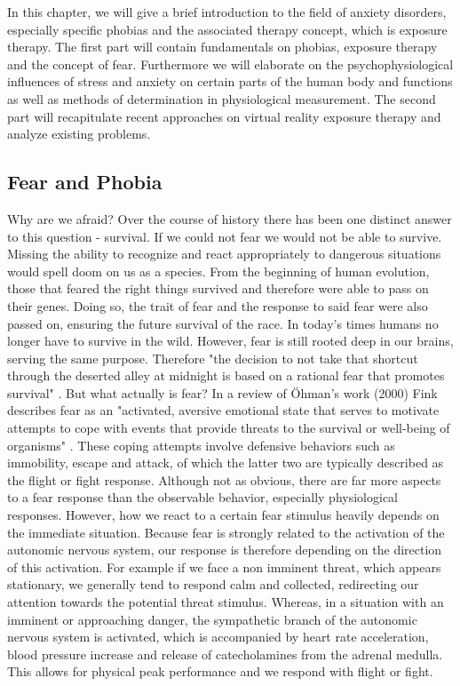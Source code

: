 In this chapter, we will give a brief introduction to the field of anxiety disorders, especially specific phobias and the associated therapy concept, which is exposure therapy. The first part will contain fundamentals on phobias, exposure therapy and the concept of fear. Furthermore we will elaborate on the psychophysiological influences of stress and anxiety on certain parts of the human body and functions as well as methods of determination in physiological measurement. The second part will recapitulate recent approaches on virtual reality exposure therapy and analyze existing problems. 

\subsection{Fear and Phobia} 
Why are we afraid? Over the course of history there has been one distinct answer to this question - survival. If we could not fear we would not be able to survive. Missing the ability to recognize and react appropriately to dangerous situations would spell doom on us as a species. From the beginning of human evolution, those that feared the right things survived and therefore were able to pass on their genes. Doing so, the trait of fear and the response to said fear were also passed on, ensuring the future survival of the race. In today's times humans no longer have to survive in the wild. However, fear is still rooted deep in our brains, serving the same purpose. Therefore "the decision to not take that shortcut through the deserted alley at midnight is based on a rational fear that promotes survival" \cite{LAYTON2005}. But what actually is fear? In a review of Öhman's work (2000) Fink describes fear as an "activated, aversive emotional state that serves to motivate attempts to cope with events that provide threats to the survival or well-being of organisms" \cite{FINK2010}. These coping attempts involve defensive behaviors such as immobility, escape and attack, of which the latter two are typically described as the flight or fight response. Although not as obvious, there are far more aspects to a fear response than the observable behavior, especially physiological responses. However, how we react to a certain fear stimulus heavily depends on the immediate situation. Because fear is strongly related to the activation of the autonomic nervous system, our response is therefore depending on the direction of this activation. For example if we face a non imminent threat, which appears stationary, we generally tend to respond calm and collected, redirecting our attention towards the potential threat stimulus. Whereas, in a situation with an imminent or approaching danger, the sympathetic branch of the autonomic nervous system is activated, which is accompanied by heart rate acceleration, blood pressure increase and release of catecholamines from the adrenal medulla. This allows for physical peak performance and we respond with flight or fight. \\ 

